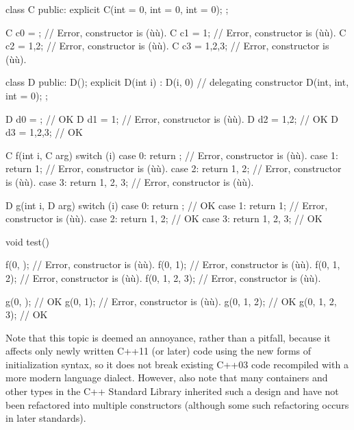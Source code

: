 \begin{emcppslisting}
class C
{
public:
    explicit C(int = 0, int = 0, int = 0);
};

C c0 = {};       // Error, constructor is (ù{}ù).
C c1 = {1};      // Error, constructor is (ù{}ù).
C c2 = {1,2};    // Error, constructor is (ù{}ù).
C c3 = {1,2,3};  // Error, constructor is (ù{}ù).

class D
{
public:
    D();
    explicit D(int i) : D(i, 0) { }  // delegating constructor
    D(int, int, int = 0);
};

D d0 = {};       // OK
D d1 = {1};      // Error, constructor is (ù{}ù).
D d2 = {1,2};    // OK
D d3 = {1,2,3};  // OK

C f(int i, C arg)
{
    switch (i)
    {
        case 0: return {};         // Error, constructor is (ù{}ù).
        case 1: return {1};        // Error, constructor is (ù{}ù).
        case 2: return {1, 2};     // Error, constructor is (ù{}ù).
        case 3: return {1, 2, 3};  // Error, constructor is (ù{}ù).
    }
}

D g(int i, D arg)
{
    switch (i)
    {
      case 0: return {};         // OK
      case 1: return {1};        // Error, constructor is (ù{}ù).
      case 2: return {1, 2};     // OK
      case 3: return {1, 2, 3};  // OK
    }
}

void test()
{
    f(0, {});         // Error, constructor is (ù{}ù).
    f(0, {1});        // Error, constructor is (ù{}ù).
    f(0, {1, 2});     // Error, constructor is (ù{}ù).
    f(0, {1, 2, 3});  // Error, constructor is (ù{}ù).

    g(0, {});         // OK
    g(0, {1});        // Error, constructor is (ù{}ù).
    g(0, {1, 2});     // OK
    g(0, {1, 2, 3});  // OK
}
\end{emcppslisting}


\noindent Note that this topic is deemed an annoyance, rather than a pitfall,
because it affects only newly written C++11 (or later) code using the
new forms of initialization syntax, so it does not break existing C++03
code recompiled with a more modern language dialect. However, also note
that many containers and other types in the C++ Standard Library
inherited such a design and have not been refactored into multiple
constructors (although some such refactoring occurs in later standards).

